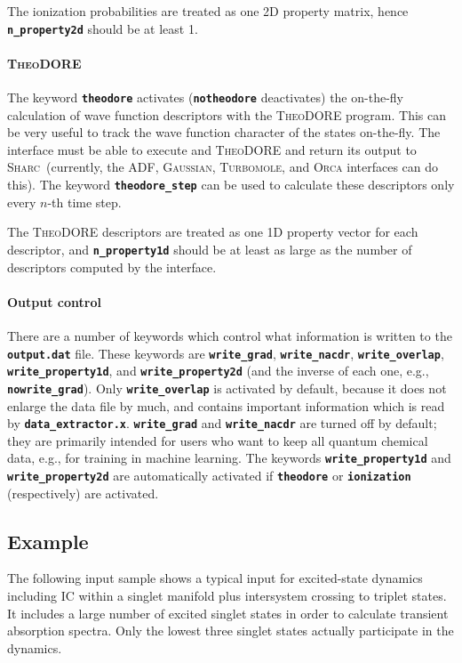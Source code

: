 \documentclass[a4paper,10pt,DIV=15,openany]{scrbook}
\newcommand{\sharc}{\textsc{Sharc}}
\newcommand{\ttt}[1]{\textbf{\texttt{#1}}}
\begin{document}
The ionization probabilities are treated as one 2D property matrix, hence \ttt{n\_property2d} should be at least 1.

\paragraph{\textsc{TheoDORE}}

The keyword \ttt{theodore} activates (\ttt{notheodore} deactivates) the on-the-fly calculation of wave function descriptors with the \textsc{TheoDORE} program. This can be very useful to track the wave function character of the states on-the-fly.
The interface must be able to execute and \textsc{TheoDORE} and return its output to \sharc\ (currently, the ADF, \textsc{Gaussian}, \textsc{Turbomole}, and \textsc{Orca} interfaces can do this). The keyword \ttt{theodore\_step} can be used to calculate these descriptors only every $n$-th time step. 

The \textsc{TheoDORE} descriptors are treated as one 1D property vector for each descriptor, and \ttt{n\_property1d} should be at least as large as the number of descriptors computed by the interface.

\paragraph{Output control}

There are a number of keywords which control what information is written to the \ttt{output.dat} file.
These keywords are \ttt{write\_grad}, \ttt{write\_nacdr}, \ttt{write\_overlap}, \ttt{write\_property1d}, and \ttt{write\_property2d} (and the inverse of each one, e.g., \ttt{nowrite\_grad}).
Only \ttt{write\_overlap} is activated by default, because it does not enlarge the data file by much, and contains important information which is read by \ttt{data\_extractor.x}.
\ttt{write\_grad} and \ttt{write\_nacdr} are turned off by default; they are primarily intended for users who want to keep all quantum chemical data, e.g., for training in machine learning.
The keywords \ttt{write\_property1d} and \ttt{write\_property2d} are automatically activated if \ttt{theodore} or \ttt{ionization} (respectively) are activated.




\subsection{Example}

The following input sample shows a typical input for excited-state dynamics including IC within a singlet manifold plus intersystem crossing to triplet states. It includes a large number of excited singlet states in order to calculate transient absorption spectra. Only the lowest three singlet states actually participate in the dynamics. 
\end{document}
